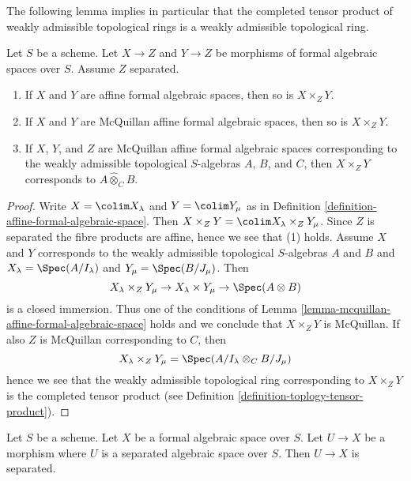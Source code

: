 \noindent
The following lemma implies in particular that the completed
tensor product of weakly admissible topological rings is
a weakly admissible topological ring.

\begin{lemma}
\label{lemma-fibre-product-affines-over-separated}
Let $S$ be a scheme. Let $X \to Z$ and $Y \to Z$ be morphisms
of formal algebraic spaces over $S$. Assume $Z$ separated.
\begin{enumerate}
\item If $X$ and $Y$ are affine formal algebraic spaces, then
so is $X \times_Z Y$.
\item If $X$ and $Y$ are McQuillan affine formal algebraic spaces, then
so is $X \times_Z Y$.
\item If $X$, $Y$, and $Z$ are McQuillan affine formal algebraic spaces
corresponding to the weakly admissible topological $S$-algebras
$A$, $B$, and $C$, then $X \times_Z Y$ corresponds to
$A \widehat{\otimes}_C B$.
\end{enumerate}
\end{lemma}

\begin{proof}
Write $X = \colim X_\lambda$ and $Y = \colim Y_\mu$ as
in Definition \ref{definition-affine-formal-algebraic-space}.
Then $X \times_Z Y = \colim X_\lambda \times_Z Y_\mu$.
Since $Z$ is separated the fibre products are affine, hence
we see that (1) holds. Assume $X$ and $Y$ corresponds to
the weakly admissible topological $S$-algebras $A$ and $B$
and $X_\lambda = \Spec(A/I_\lambda)$ and $Y_\mu = \Spec(B/J_\mu)$.
Then
$$
X_\lambda \times_Z Y_\mu \to
X_\lambda \times Y_\mu \to \Spec(A \otimes B)
$$
is a closed immersion. Thus one of the conditions of
Lemma \ref{lemma-mcquillan-affine-formal-algebraic-space}
holds and we conclude that $X \times_Z Y$ is McQuillan.
If also $Z$ is McQuillan corresponding to $C$, then
$$
X_\lambda \times_Z Y_\mu = \Spec(A/I_\lambda \otimes_C B/J_\mu)
$$
hence we see that the weakly admissible topological ring
corresponding to $X \times_Z Y$ is the completed tensor product
(see Definition \ref{definition-toplogy-tensor-product}).
\end{proof}

\begin{lemma}
\label{lemma-separated-from-separated}
Let $S$ be a scheme. Let $X$ be a formal algebraic space over $S$.
Let $U \to X$ be a morphism where $U$ is a separated algebraic
space over $S$. Then $U \to X$ is separated.
\end{lemma}

